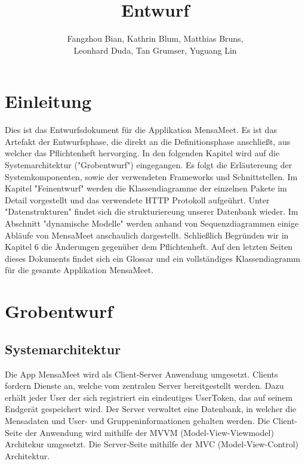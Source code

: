 \documentclass[a4paper]{scrreprt}
\begin{document}
\title{Entwurf}
\author{Fangzhou Bian, Kathrin Blum, Matthias Bruns, \\Leonhard Duda, Tan Grumser, Yuguang Lin}
\maketitle
\tableofcontents



\chapter{Einleitung}
Dies ist das Entwurfsdokument für die Applikation \dq MensaMeet\dq.  Es ist das Artefakt der Entwurfsphase, die direkt an die Definitionsphase anschließt, aus welcher das Pflichtenheft hervorging.
In den folgenden Kapitel wird auf die Systemarchitektur ("Grobentwurf") eingegangen. Es folgt die Erläutereung der Systemkomponenten, sowie der verwendeten Frameworks und Schnittstellen. Im Kapitel "Feinentwurf" werden die Klassendiagramme der einzelnen Pakete im Detail vorgestellt und das verwendete HTTP Protokoll aufgeührt. Unter "Datenstrukturen" findet sich die strukturiereung unserer Datenbank wieder. 
Im Abschnitt "dynamische Modelle" werden anhand von Sequenzdiagrammen einige Abläufe von MensaMeet anschaulich dargestellt.
Schließlich Begründen wir in Kapitel 6 die Änderungen gegenüber dem Pflichtenheft.
Auf den letzten Seiten dieses Dokuments findet sich ein Glossar und ein vollständiges Klassendiagramm für die gesamte Applikation MensaMeet.



\chapter{Grobentwurf}
\section{Systemarchitektur}
Die App MensaMeet wird als Client-Server Anwendung umgesetzt. Clients fordern Dienste an, welche vom zentralen Server bereitgestellt werden. Dazu erhält jeder User der sich registriert ein eindeutiges UserToken, das auf seinem Endgerät gespeichert wird. Der Server verwaltet eine Datenbank, in welcher die Mensadaten und User- und Gruppeninformationen gehalten werden. 
Die Client-Seite der Anwendung wird mithilfe der MVVM (Model-View-Viewmodel) Architekur umgesetzt.
Die Server-Seite mithilfe der MVC (Model-View-Control) Architektur.
\end{document}
